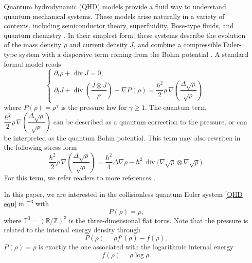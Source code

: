 \documentclass[11pt]{article}
\begin{document}
Quantum hydrodynamic (QHD) models provide a fluid way to understand quantum mechanical systems. These models arise naturally in a variety of contexts, including semiconductor theory, superfluidity, Bose-type fluids, and quantum chemistry \cite{AI,AM,ABC,Fey,Grant, HZ, J1,JM,Kad,Kha,Landau,Wy}. In their simplest form, these systems describe the evolution of the mass density \(\rho\) and current density \(J\), and combine a compressible Euler-type system with a dispersive term coming from the Bohm potential \cite{AM,Bo,DGPS,Grant}. A standard formal model reads
\begin{equation}\label{QHD equ}
\begin{cases}
\partial_t \rho + \operatorname{div}J = 0, \\[1mm]
\partial_t J + \operatorname{div}\!\left(\dfrac{J\otimes J}{\rho}\right) + \nabla P(\rho)
=
\dfrac{\hbar^2}{2}\rho\,\nabla\!\left(\dfrac{\Delta\sqrt{\rho}}{\sqrt{\rho}}\right).
\end{cases}
\end{equation}
where
$P(\rho)=\rho^{\gamma}$ 
 is the pressure law for $\gamma\geq 1$. The quantum term $
\dfrac{\hbar^2}{2}\rho\,\nabla\!\left(\dfrac{\Delta\sqrt{\rho}}{\sqrt{\rho}}\right)
$ can be described as a quantum correction to the pressure, or can be interpreted as the quantum Bohm potential. 
This term may also rewriten in the following stress form
\[
\frac{\hbar^2}{2}\rho\,\nabla\!\left(\frac{\Delta\sqrt{\rho}}{\sqrt{\rho}}\right)
=
\frac{\hbar^2}{4}\Delta\nabla\rho
-
\hbar^2\,\operatorname{div}\!\bigl(\nabla\sqrt{\rho}\otimes\nabla\sqrt{\rho}\bigr).
\]
For this term, we refer readers to more references
\cite{AntonelliMarcati2009,AntonelliMarcati2012,CarlesDanchinSaut2012,Jungel2010, JM, ST,VasseurYu2016QNS}.

\medskip




In this paper, we are interested in the collisionless quantum Euler system \eqref{QHD equ} in $\mathbb{T}^3$ with $$P(\rho)=\rho,$$
where $\mathbb{T}^3 = (\mathbb{R}/\mathbb{Z})^3$ is the three-dimensional flat torus.
Note  that the pressure is related to the internal energy density through
\[
P(\rho)=\rho f'(\rho)-f(\rho),
\]
 \(P(\rho)=\rho\) is exactly the one associated with the logarithmic internal energy \[f(\rho)=\rho\log\rho.\]
\end{document}
